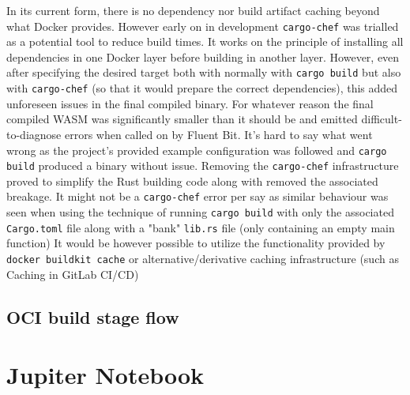 In its current form, there is no dependency nor build artifact caching beyond what Docker provides. However early on in development \texttt{cargo-chef} was trialled as a potential tool to reduce build times. It works on the principle of installing all dependencies in one Docker layer before building in another layer. However, even after specifying the desired target both with normally with \texttt{cargo build} but also with \texttt{cargo-chef} (so that it would prepare the correct dependencies), this added unforeseen issues in the final compiled binary. For whatever reason the final compiled WASM was significantly smaller than it should be and emitted difficult-to-diagnose errors when called on by Fluent Bit. It's hard to say what went wrong as the project's provided example configuration was followed and \texttt{cargo build} produced a binary without issue. Removing the \texttt{cargo-chef} infrastructure proved to simplify the Rust building code along with removed the associated breakage. It might not be a \texttt{cargo-chef} error per say as similar behaviour was seen when using the technique of running \texttt{cargo build} with only the associated \texttt{Cargo.toml} file along with a "bank" \texttt{lib.rs} file (only containing an empty main function)
It would be however possible to utilize the functionality provided by \texttt{docker buildkit cache} or alternative/derivative caching infrastructure (such as Caching in GitLab CI/CD)

\subsection{OCI build stage flow}


\section{Jupiter Notebook}
